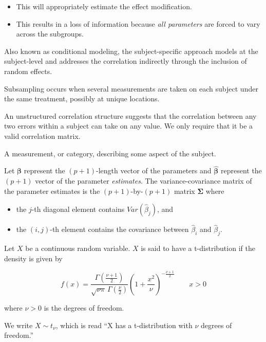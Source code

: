 \documentclass[
  letterpaper,
  DIV=11,
  numbers=noendperiod]{scrreprt}
\providecommand{\tightlist}{%
  \setlength{\itemsep}{0pt}\setlength{\parskip}{0pt}}\usepackage{longtable,booktabs,array}
\theoremstyle{definition}
\theoremstyle{definition}
\theoremstyle{remark}
\begin{document}
\begin{itemize}
\tightlist
\item
  This will appropriately estimate the effect modification.
\item
  This results in a loss of information because \emph{all parameters}
  are forced to vary across the subgroups.
\end{itemize}

\begin{description}
\tightlist
\item[Subject Specific Models (Definition~\ref{def-subject-specific})]
Also known as conditional modeling, the subject-specific approach models
at the subject-level and addresses the correlation indirectly through
the inclusion of random effects.
\item[Subsampling (Definition~\ref{def-subsampling})]
Subsampling occurs when several measurements are taken on each subject
under the same treatment, possibly at unique locations.
\item[Unstructured Correlation Structure
(Definition~\ref{def-unstructured-correlation-structure})]
An unstructured correlation structure suggests that the correlation
between any two errors within a subject can take on any value. We only
require that it be a valid correlation matrix.
\item[Variable (Definition~\ref{def-variable})]
A measurement, or category, describing some aspect of the subject.
\item[Variance-Covariance Matrix
(Definition~\ref{def-variance-covariance-matrix})]
Let \(\boldsymbol{\beta}\) represent the \((p+1)\)-length vector of the
parameters and \(\widehat{\boldsymbol{\beta}}\) represent the \((p+1)\)
vector of the parameter \emph{estimates}. The variance-covariance matrix
of the parameter estimates is the \((p+1)\)-by-\((p+1)\) matrix
\(\boldsymbol{\Sigma}\) where
\end{description}

\begin{itemize}
\tightlist
\item
  the \(j\)-th diagonal element contains
  \(Var\left(\widehat{\beta}_j\right)\), and
\item
  the \((i,j)\)-th element contains the covariance between
  \(\widehat{\beta}_i\) and \(\widehat{\beta}_j\).
\end{itemize}

\begin{description}
\tightlist
\item[t-Distribution (Definition~\ref{def-t-distribution})]
Let \(X\) be a continuous random variable. \(X\) is said to have a
t-distribution if the density is given by
\end{description}

\[f(x) = \frac{\Gamma \left(\frac{\nu+1}{2} \right)} {\sqrt{\nu\pi}\,\Gamma \left(\frac{\nu}{2} \right)} \left(1+\frac{x^2}{\nu} \right)^{-\frac{\nu+1}{2}} \qquad x > 0\]

where \(\nu > 0\) is the degrees of freedom.

We write \(X \sim t_{\nu}\), which is read ``X has a t-distribution with
\(\nu\) degrees of freedom.''
\end{document}
